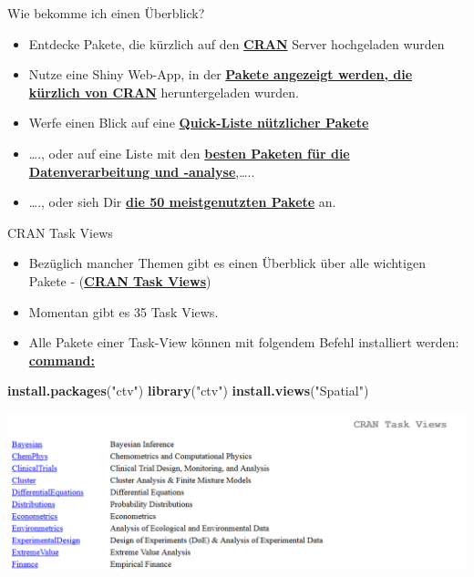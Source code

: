 \documentclass[ignorenonframetext,]{beamer}
\newenvironment{Shaded}{\begin{snugshade}}{\end{snugshade}}
\newcommand{\KeywordTok}[1]{\textcolor[rgb]{0.26,0.66,0.93}{\textbf{#1}}}
\newcommand{\StringTok}[1]{\textcolor[rgb]{0.02,0.61,0.04}{#1}}
\newcommand{\NormalTok}[1]{\textcolor[rgb]{0.74,0.68,0.62}{#1}}
\providecommand{\tightlist}{%
  \setlength{\itemsep}{0pt}\setlength{\parskip}{0pt}}
\begin{document}
\begin{frame}{Wie bekomme ich einen Überblick?}

\begin{itemize}
\item
  Entdecke Pakete, die kürzlich auf den
  \href{https://mran.microsoft.com/packages/}{\textbf{CRAN}} Server
  hochgeladen wurden
\item
  Nutze eine Shiny Web-App, in der
  \href{https://gallery.shinyapps.io/cran-gauge/}{\textbf{Pakete
  angezeigt werden, die kürzlich von CRAN}} heruntergeladen wurden.
\item
  Werfe einen Blick auf eine
  \href{https://support.rstudio.com/hc/en-us/articles/201057987-Quick-list-of-useful-R-packages}{\textbf{Quick-Liste
  nützlicher Pakete}}
\item
  \ldots{}., oder auf eine Liste mit den
  \href{http://www.computerworld.com/article/2921176/business-intelligence/great-r-packages-for-data-import-wrangling-visualization.html}{\textbf{besten
  Paketen für die Datenverarbeitung und -analyse}},\ldots{}..
\item
  \ldots{}., oder sieh Dir
  \href{https://www.r-bloggers.com/the-50-most-used-r-packages/}{\textbf{die
  50 meistgenutzten Pakete}} an.
\end{itemize}

\end{frame}

\begin{frame}[fragile]{CRAN Task Views}

\begin{itemize}
\tightlist
\item
  Bezüglich mancher Themen gibt es einen Überblick über alle wichtigen
  Pakete - (\href{https://cran.r-project.org/web/views/}{\textbf{CRAN
  Task Views}})
\item
  Momentan gibt es 35 Task Views.
\item
  Alle Pakete einer Task-View können mit folgendem Befehl installiert
  werden:
  \href{https://mran.microsoft.com/rpackages/}{\textbf{command:}}
\end{itemize}

\begin{Shaded}
\begin{Highlighting}[]
\KeywordTok{install.packages}\NormalTok{(}\StringTok{"ctv"}\NormalTok{)}
\KeywordTok{library}\NormalTok{(}\StringTok{"ctv"}\NormalTok{)}
\KeywordTok{install.views}\NormalTok{(}\StringTok{"Spatial"}\NormalTok{)}
\end{Highlighting}
\end{Shaded}

\includegraphics{figure/CRANtaskViews.PNG}

\end{frame}
\end{document}
